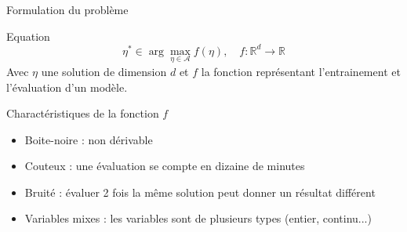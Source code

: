 \begin{frame}{Formulation du problème}
    \begin{block}{Equation}
        \begin{equation}
            \eta^* \in \arg \max_{\eta \in \mathcal A}f(\eta), \quad f:\mathbb{R}^d \rightarrow \mathbb{R}
        \end{equation}
        Avec $\eta$ une solution de dimension $d$ et $f$ la fonction représentant l'entrainement et l'évaluation d'un modèle.
    \end{block}

    \begin{block}{Charactéristiques de la fonction $f$}
        \begin{itemize}
            \item Boite-noire : non dérivable
            \item Couteux : une évaluation se compte en dizaine de minutes
            \item Bruité : évaluer 2 fois la même solution peut donner un résultat différent
            \item Variables mixes : les variables sont de plusieurs types (entier, continu...)
        \end{itemize}
        
    \end{block}
    
   
\end{frame}